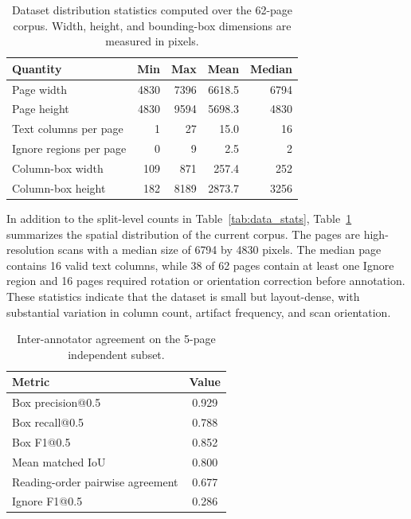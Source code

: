 \documentclass[pdflatex,sn-mathphys-num]{sn-jnl}
\begin{document}
\begin{table}[t]
\centering
\scriptsize\setlength{\tabcolsep}{3pt}
\caption{Dataset distribution statistics computed over the 62-page corpus. Width, height, and bounding-box dimensions are measured in pixels.}
\label{tab:dataset_distribution}
\begin{tabular}{lrrrr}
\toprule
Quantity & Min & Max & Mean & Median \\
\midrule
Page width & 4830 & 7396 & 6618.5 & 6794 \\
Page height & 4830 & 9594 & 5698.3 & 4830 \\
Text columns per page & 1 & 27 & 15.0 & 16 \\
Ignore regions per page & 0 & 9 & 2.5 & 2 \\
Column-box width & 109 & 871 & 257.4 & 252 \\
Column-box height & 182 & 8189 & 2873.7 & 3256 \\
\bottomrule
\end{tabular}
\end{table}

In addition to the split-level counts in Table~\ref{tab:data_stats}, Table~\ref{tab:dataset_distribution} summarizes the spatial distribution of the current corpus. The pages are high-resolution scans with a median size of 6794 by 4830 pixels. The median page contains 16 valid text columns, while 38 of 62 pages contain at least one Ignore region and 16 pages required rotation or orientation correction before annotation. These statistics indicate that the dataset is small but layout-dense, with substantial variation in column count, artifact frequency, and scan orientation.

\begin{table}[t]
\centering
\scriptsize\setlength{\tabcolsep}{3pt}
\caption{Inter-annotator agreement on the 5-page independent subset.}
\label{tab:iaa}
\begin{tabular}{lc}
\toprule
Metric & Value \\
\midrule
Box precision@0.5 & 0.929 \\
Box recall@0.5 & 0.788 \\
Box F1@0.5 & 0.852 \\
Mean matched IoU & 0.800 \\
Reading-order pairwise agreement & 0.677 \\
Ignore F1@0.5 & 0.286 \\
\bottomrule
\end{tabular}
\end{table}
\end{document}
